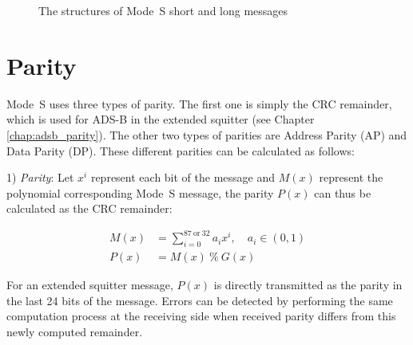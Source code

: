 \begin{figure}[!ht]
  \centering
  \caption{The structures of Mode~S short and long messages}
  \label{fig:modes_msg_structures}
\end{figure}




\section{Parity} \label{sec:parity}

Mode~S uses three types of parity. The first one is simply the CRC remainder, which is used for ADS-B in the extended squitter (see Chapter \ref{chap:adsb_parity}). The other two types of parities are Address Parity (AP) and Data Parity (DP). These different parities can be calculated as follows:

1) \emph{Parity}: Let  $x^{i}$ represent each bit of the message and $M(x)$ represent the polynomial corresponding Mode~S message, the parity $P(x)$ can thus be calculated as the CRC remainder:

\begin{equation} \label{eq:crc}
  \begin{split}
    M(x) &= \sum_{i=0}^{87~\mathrm{or}~32} a_i x^i , \quad a_i \in (0, 1)\\
    P(x) &= M(x) ~ \% ~ G(x)
  \end{split}
\end{equation}

For an extended squitter message, $P(x)$ is directly transmitted as the parity in the last 24 bits of the message. Errors can be detected by performing the same computation process at the receiving side when received parity differs from this newly computed remainder.

